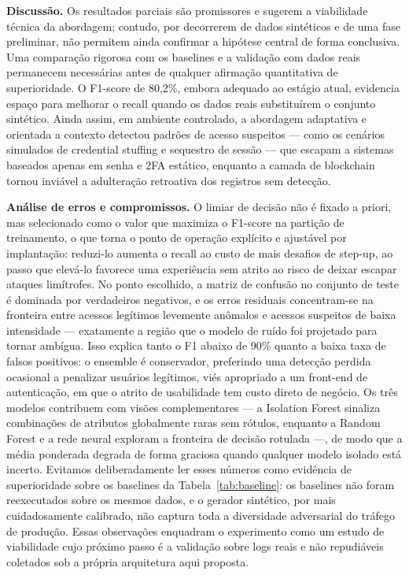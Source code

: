 \documentclass[conference]{IEEEtran}
\begin{document}
\textbf{Discussão.} Os resultados parciais são promissores e sugerem a
viabilidade técnica da abordagem; contudo, por decorrerem de dados
sintéticos e de uma fase preliminar, não permitem ainda confirmar a
hipótese central de forma conclusiva. Uma comparação rigorosa com os
baselines e a validação com dados reais permanecem necessárias antes de
qualquer afirmação quantitativa de superioridade. O F1-score de 80,2\%,
embora adequado ao estágio atual, evidencia espaço para melhorar o recall
quando os dados reais substituírem o conjunto sintético. Ainda assim, em
ambiente controlado, a abordagem adaptativa e orientada a contexto
detectou padrões de acesso suspeitos --- como os cenários simulados de
credential stuffing e sequestro de sessão --- que escapam a sistemas
baseados apenas em senha e 2FA estático, enquanto a camada de blockchain
tornou inviável a adulteração retroativa dos registros sem detecção.

\textbf{Análise de erros e compromissos.} O limiar de decisão não é
fixado a priori, mas selecionado como o valor que maximiza o F1-score na
partição de treinamento, o que torna o ponto de operação explícito e
ajustável por implantação: reduzi-lo aumenta o recall ao custo de mais
desafios de step-up, ao passo que elevá-lo favorece uma experiência sem
atrito ao risco de deixar escapar ataques limítrofes. No ponto
escolhido, a matriz de confusão no conjunto de teste é dominada por
verdadeiros negativos, e os erros residuais concentram-se na fronteira
entre acessos legítimos levemente anômalos e acessos suspeitos de baixa
intensidade --- exatamente a região que o modelo de ruído foi projetado
para tornar ambígua. Isso explica tanto o F1 abaixo de 90\% quanto a
baixa taxa de falsos positivos: o ensemble é conservador, preferindo uma
detecção perdida ocasional a penalizar usuários legítimos, viés
apropriado a um front-end de autenticação, em que o atrito de
usabilidade tem custo direto de negócio. Os três modelos contribuem com
visões complementares --- a Isolation Forest sinaliza combinações de
atributos globalmente raras sem rótulos, enquanto a Random Forest e a
rede neural exploram a fronteira de decisão rotulada ---, de modo que a
média ponderada degrada de forma graciosa quando qualquer modelo
isolado está incerto. Evitamos deliberadamente ler esses números como
evidência de superioridade sobre os baselines da
Tabela~\ref{tab:baseline}: os baselines não foram reexecutados sobre os
mesmos dados, e o gerador sintético, por mais cuidadosamente calibrado,
não captura toda a diversidade adversarial do tráfego de produção. Essas
observações enquadram o experimento como um estudo de viabilidade cujo
próximo passo é a validação sobre logs reais e não repudiáveis coletados
sob a própria arquitetura aqui proposta.
\end{document}
